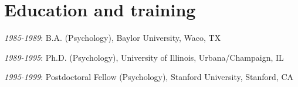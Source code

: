 \section*{Education and training}
\noindent

\textit{1985-1989}: B.A. (Psychology), Baylor University, Waco, TX

\textit{1989-1995}: Ph.D. (Psychology), University of Illinois, Urbana/Champaign, IL

\textit{1995-1999}: Postdoctoral Fellow (Psychology), Stanford University, Stanford, CA

